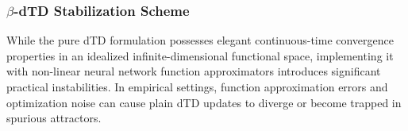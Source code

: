 \documentclass{article}
\begin{document}
\begin{table}[htbp]
\centering
\caption{Comparison of Target and Prediction terms across different TD formulations.}
\label{tab:td_methods}
\end{table}

\subsubsection{\texorpdfstring{$\beta$}{beta}-dTD Stabilization Scheme}
While the pure dTD formulation possesses elegant continuous-time convergence properties in an idealized infinite-dimensional functional space, implementing it with non-linear neural network function approximators introduces significant practical instabilities. In empirical settings, function approximation errors and optimization noise can cause plain dTD updates to diverge or become trapped in spurious attractors.
\end{document}
